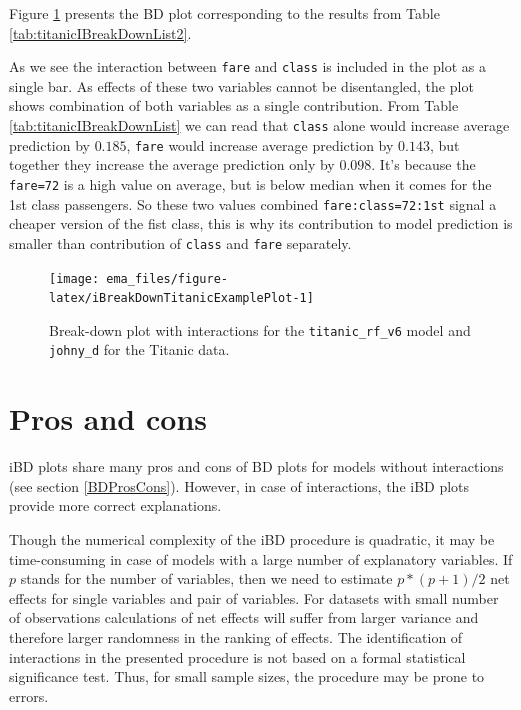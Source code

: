 \documentclass[]{krantz}
\begin{document}
Figure \ref{fig:iBreakDownTitanicExamplePlot} presents the BD plot corresponding to the results from Table \ref{tab:titanicIBreakDownList2}.

As we see the interaction between \texttt{fare} and \texttt{class} is included in the plot as a single bar. As effects of these two variables cannot be disentangled, the plot shows combination of both variables as a single contribution.
From Table \ref{tab:titanicIBreakDownList} we can read that \texttt{class} alone would increase average prediction by \(0.185\), \texttt{fare} would increase average prediction by \(0.143\), but together they increase the average prediction only by \(0.098\). It's because the \texttt{fare=72} is a high value on average, but is below median when it comes for the 1st class passengers. So these two values combined \texttt{fare:class=72:1st} signal a cheaper version of the fist class, this is why its contribution to model prediction is smaller than contribution of \texttt{class} and \texttt{fare} separately.



\begin{figure}

{\centering \texttt{[image: ema\_files/figure-latex/iBreakDownTitanicExamplePlot-1]} 

}

\caption{Break-down plot with interactions for the \texttt{titanic\_rf\_v6} model and \texttt{johny\_d} for the Titanic data.}\label{fig:iBreakDownTitanicExamplePlot}
\end{figure}

\hypertarget{iBDProsCons}{%
\section{Pros and cons}\label{iBDProsCons}}

iBD plots share many pros and cons of BD plots for models without interactions (see section \ref{BDProsCons}). However, in case of interactions, the iBD plots provide more correct explanations.

Though the numerical complexity of the iBD procedure is quadratic, it may be time-consuming in case of models with a large number of explanatory variables. If \(p\) stands for the number of variables, then we need to estimate \(p*(p+1)/2\) net effects for single variables and pair of variables. For datasets with small number of observations calculations of net effects will suffer from larger variance and therefore larger randomness in the ranking of effects.
The identification of interactions in the presented procedure is not based on a formal statistical significance test. Thus, for small sample sizes, the procedure may be prone to errors.
\end{document}
